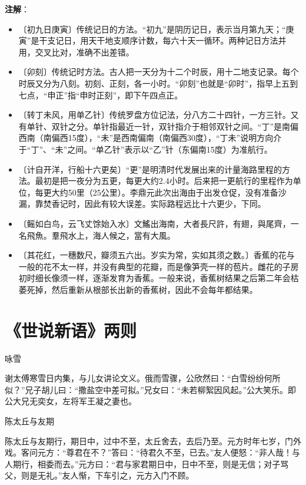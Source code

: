 \documentclass[12pt,UTF-8,openany]{ctexbook}
\begin{document}
\newpage

\textbf{注解}：

\vspace{-1em}

\begin{itemize}
    \setlength\itemsep{-0.2em}
    \item〔初九日庚寅〕传统记日的方法。“初九”是阴历记日，表示当月第九天；“庚寅”是干支记日，用天干地支顺序计数，每六十天一循环。两种记日方法并用，交叉比对，准确不出差错。
    \item〔卯刻〕传统记时方法。古人把一天分为十二个时辰，用十二地支记录。每个时辰又分为八刻。初刻、正刻，各一小时。“卯刻”也就是“卯时”，指早上五到七点，“申正”指“申时正刻”，即下午四点正。
    \item〔转丁未风，用单乙针〕传统罗盘方位记法，分八方二十四针，一方三针。又有单针、双针之分。单针指最近一针，双针指介于相邻双针之间。“丁”是南偏西南（南偏西15度），“未”是西南偏南（南偏西30度），“丁未”说明方向介于“丁”、“未”之间。“单乙针”表示以“乙”针（东偏南15度）为准航行。
    \item〔计自开洋，行船十六更矣〕“更”是明清时代发展出来的计量海路里程的方法。最初是把一夜分为五更，每更大约2.4小时。后来把一更航行的里程作为单位，每更大约50里（25公里）。李鼎元此次出海由于出发仓促，没有准备沙漏，靠焚香记时，因此有较大误差。实际路程远比十六更少，下同。
    \item〔鳐如白鸟，云飞丈馀始入水〕文鰩出海南，大者長尺許，有翅，與尾齊，一名飛魚。羣飛水上，海人候之，當有大風。
    \item〔其花红，一穗数尺，瓣须五六出。岁实为常，实如其须之数。〕香蕉的花与一般的花不太一样，并没有典型的花瓣，而是像笋壳一样的苞片。雌花的子房初时细长像须一样，逐渐发育为香蕉。一般来说，香蕉树结果之后第二年会枯萎死掉，然后重新从根部长出新的香蕉树，因此不会每年都结果。
\end{itemize}

\chapter{《世说新语》两则}

\begin{normalsize}
    
    咏雪
    
    谢太傅寒雪日内集，与儿女讲论文义。俄而雪骤，公欣然曰：“白雪纷纷何所似？”兄子胡儿曰：“撒盐空中差可拟。”兄女曰：“未若柳絮因风起。”公大笑乐。即公大兄无奕女，左将军王凝之妻也。
    
    陈太丘与友期
    
    陈太丘与友期行，期日中，过中不至，太丘舍去，去后乃至。元方时年七岁，门外戏。客问元方：“尊君在不？”答曰：“待君久不至，已去。”友人便怒：“非人哉！与人期行，相委而去。”元方曰：“君与家君期日中，日中不至，则是无信；对子骂父，则是无礼。”友人惭，下车引之，元方入门不顾。
\end{normalsize}
\end{document}
